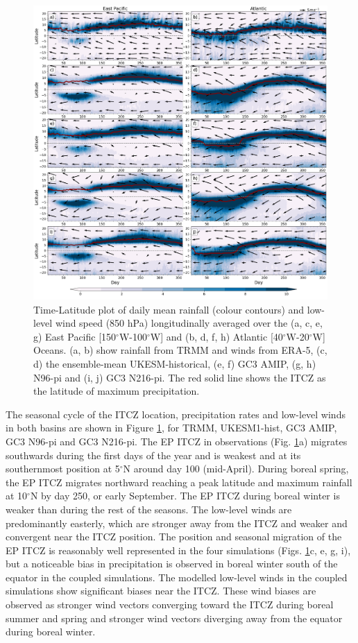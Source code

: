 \begin{figure}[t!]
\centering
 \includegraphics[width=\linewidth]{figures/fig3_p2_v3.png}
\caption[Seasonal evolution of Atlantic and Pacific ITCZ]{ Time-Latitude plot of daily mean rainfall (colour contours) and low-level wind speed (850 hPa) longitudinally averaged over the (a, c, e, g) East Pacific [150$^\circ$W-100$^\circ$W] and (b, d, f, h) Atlantic [40$^\circ$W-20$^\circ$W] Oceans. (a, b) show rainfall from TRMM and winds from ERA-5, (c, d) the ensemble-mean UKESM-historical, (e, f) GC3 AMIP, (g, h) N96-pi and (i, j) GC3 N216-pi. The red solid line shows the ITCZ as the latitude of maximum precipitation.  }
\label{fig:4}
\end{figure}


The seasonal cycle of the ITCZ location, precipitation rates and low-level winds in both basins are shown in Figure \ref{fig:4}, for TRMM, UKESM1-hist, GC3 AMIP, GC3 N96-pi and GC3 N216-pi.   %
The EP ITCZ in observations (Fig. \ref{fig:4}a) migrates southwards during the first days of the year and is weakest and at its southernmost position at 5$^\circ$N around day 100 (mid-April).  
During boreal spring, the EP ITCZ migrates northward reaching a peak latitude and maximum rainfall at 10$^\circ$N by day 250, or early September. The EP ITCZ during boreal winter is weaker than during the rest of the seasons.
The low-level winds are predominantly easterly, which are stronger away from the ITCZ and weaker and convergent near the ITCZ position.
The position and seasonal migration of the EP ITCZ is reasonably well represented in the four simulations (Figs. \ref{fig:4}c, e, g, i), but a noticeable bias in precipitation is observed in  boreal winter south of the equator in the coupled simulations. The modelled  low-level winds in the coupled simulations show significant biases near the ITCZ.
These wind biases are observed as stronger wind vectors converging toward the ITCZ during boreal summer and spring and stronger wind vectors diverging away from the equator during boreal winter. 

